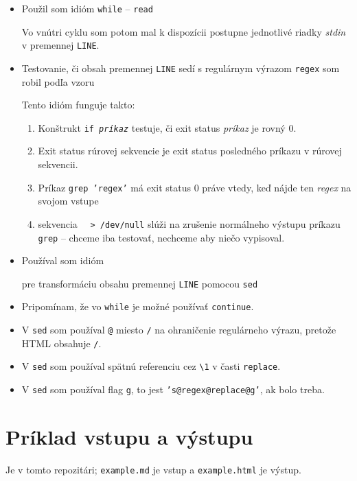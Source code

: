 \documentclass{article}
\newcommand{\codefile}[1]{\begin{framed}\end{framed}}
\begin{document}
\begin{itemize}
\item
Použil som idióm {\tt while} -- {\tt read}
\codefile{whileread.sh}
Vo vnútri cyklu som potom mal k dispozícii postupne jednotlivé riadky {\em stdin} 
v premennej {\tt LINE}.
\item Testovanie, či obsah premennej {\tt LINE} sedí s regulárnym výrazom
{\tt regex} som robil podľa vzoru
\codefile{ifechogrep.sh}
Tento idióm funguje takto:
\begin{enumerate}
\item Konštrukt {\tt if {\em príkaz}} testuje, či exit status {\em príkaz} je rovný 0.
\item Exit status rúrovej sekvencie je exit status posledného príkazu v rúrovej sekvencii.
\item Príkaz {\tt grep 'regex'} má exit status 0 práve vtedy, keď nájde ten {\em
regex} na svojom vstupe
\item sekvencia ~~{\tt > /dev/null} slúži na zrušenie normálneho výstupu príkazu 
{\tt grep} -- chceme iba testovať, nechceme aby niečo vypisoval.
\end{enumerate}
\item Používal som idióm 
\codefile{transformline.sh}
pre transformáciu obsahu premennej {\tt LINE} pomocou {\tt sed}
\item Pripomínam, že vo {\tt while} je možné používať {\tt continue}.
\item V {\tt sed} som používal {\tt @} miesto {\tt /} na ohraničenie regulárneho výrazu,
pretože HTML obsahuje {\tt /}.
\item V {\tt sed} som používal spätnú referenciu cez {\tt \textbackslash 1} v časti {\tt replace}.
\item V {\tt sed} som používal flag {\tt g}, to jest {\tt 's@regex@replace@g'},
ak bolo treba.  
\end{itemize}

\section{Príklad vstupu a výstupu}
Je v tomto repozitári; {\tt example.md} je vstup a {\tt example.html} je výstup.
\end{document}
